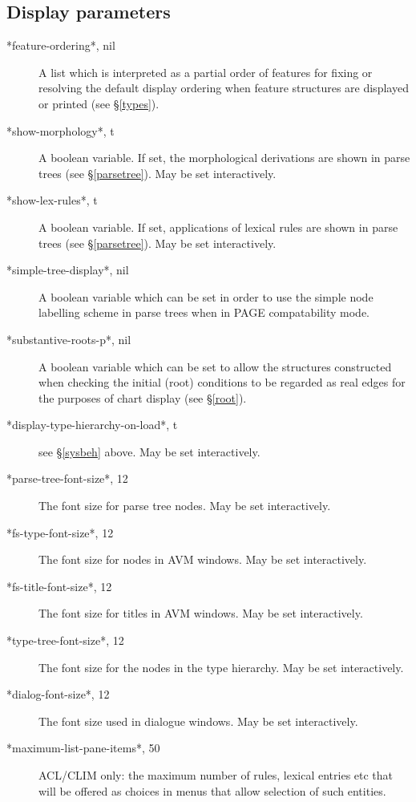 \documentclass[12pt]{report}
\begin{document}
\subsection{Display parameters}
\label{disglob}
\begin{description}
\item[*feature-ordering*, nil]
A list which is interpreted as 
a partial order of features for fixing or resolving the default 
display ordering when feature structures are displayed or printed
(see \S\ref{types}).
\item[ *show-morphology*, t]
A boolean variable.  If set, the morphological 
derivations are shown in parse trees (see \S\ref{parsetree}).
May be set interactively.
\item[ *show-lex-rules*, t]
A boolean variable. If set, 
applications of lexical rules are shown in parse trees (see \S\ref{parsetree}).
May be set interactively.
\item[ *simple-tree-display*, nil ]
A boolean variable which can be set in order 
to use the simple node labelling scheme
in parse trees when in PAGE compatability mode.
\item[ *substantive-roots-p*, nil]
A boolean variable which can
be set to allow the structures constructed when checking the
initial (root) conditions
to be regarded as real edges
for the purposes of chart display (see \S\ref{root}).
\item[*display-type-hierarchy-on-load*, t] see \S\ref{sysbeh} above.
May be set interactively.
\item[ *parse-tree-font-size*, 12] The font size for parse tree nodes.
May be set interactively.
\item[ *fs-type-font-size*, 12] The font size for nodes in AVM windows.
May be set interactively.
\item[ *fs-title-font-size*, 12] The font size for titles in AVM windows.
May be set interactively.
\item[ *type-tree-font-size*, 12] The font size for the nodes in the type hierarchy.
May be set interactively.
\item[ *dialog-font-size*, 12] The font size used in dialogue windows.
May be set interactively.
\item[ *maximum-list-pane-items*, 50] ACL/CLIM only: the maximum number
of rules, lexical entries etc that will be offered as choices in menus that
allow selection of such entities.  
\end{description}
\end{document}
